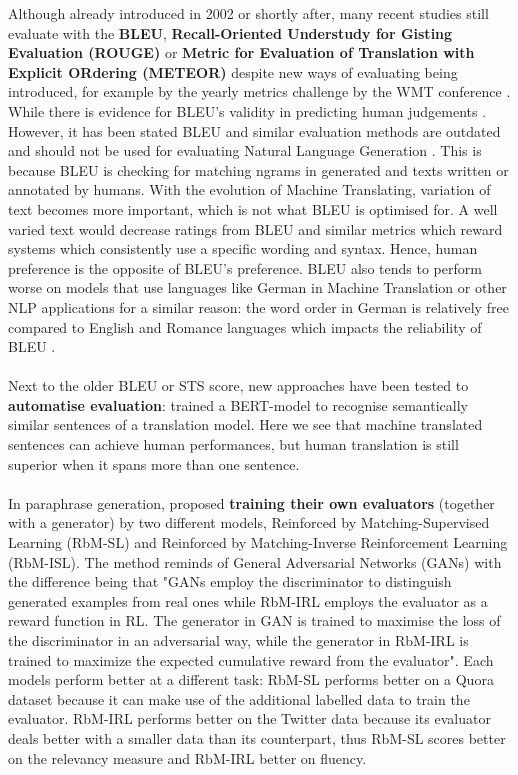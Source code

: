 \documentclass[11pt,a4paper]{article}
\begin{document}
Although already introduced in 2002 or shortly after, many recent studies still evaluate with the \textbf{BLEU}, \textbf{Recall-Oriented Understudy for Gisting Evaluation (ROUGE)} or \textbf{Metric for Evaluation of Translation with Explicit ORdering (METEOR)} \citep{lin-2004-rouge, banerjee-lavie-2005-meteor} despite new ways of evaluating being introduced, for example by the yearly metrics challenge by the WMT conference \citep{SIGMT-2020}. While there is evidence for BLEU's validity in predicting human judgements \citep{reiter-2018-astructured}. However, it has been stated BLEU and similar evaluation methods are outdated and should not be used for evaluating Natural Language Generation \citep{reiter-2020-small, reiter-2020-why, reiter-2018-astructured, mathur-etal-2020-tangled}. This is because BLEU is checking for matching ngrams in generated and texts written or annotated by humans. With the evolution of Machine Translating, variation of text becomes more important, which is not what BLEU is optimised for. A well varied text would decrease ratings from BLEU and similar metrics which reward systems which consistently use a specific wording and syntax. Hence, human preference is the opposite of BLEU's preference. BLEU also tends to perform worse on models that use languages like German in Machine Translation or other NLP applications for a similar reason: the word order in German is relatively free compared to English and Romance languages which impacts the reliability of BLEU \citet{reiter-2018-bleu}.\\\\
Next to the older BLEU or STS score, new approaches have been tested to \textbf{automatise evaluation}: \citet{yasui-etal-2019} trained a BERT-model to recognise semantically similar sentences of a translation model. Here we see that machine translated sentences can achieve human performances, but human translation is still superior when it spans more than one sentence. \\\\ 
In paraphrase generation, \citet{li-etal-2018-paraphrase} proposed \textbf{training their own evaluators} (together with a generator) by two different models, Reinforced by Matching-Supervised Learning (RbM-SL) and Reinforced by Matching-Inverse Reinforcement Learning (RbM-ISL). The method reminds of General Adversarial Networks (GANs) with the difference being that "GANs employ the discriminator to distinguish generated examples from real ones while RbM-IRL employs the evaluator as a reward function in RL. The generator in GAN is trained to maximise the loss of the discriminator in an adversarial way, while the generator in RbM-IRL is trained to maximize the expected cumulative reward from the evaluator". Each models perform better at a different task: RbM-SL performs better on a Quora dataset because it can make use of the additional labelled data to train the evaluator. RbM-IRL performs better on the Twitter data because its evaluator deals better with a smaller data than its counterpart, thus RbM-SL scores better on the relevancy measure and RbM-IRL better on fluency.
\end{document}
